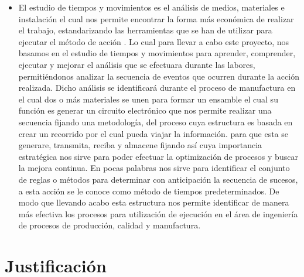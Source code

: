     
\begin{itemize}
    \item El estudio de tiempos y movimientos es el análisis de medios, materiales e instalación el cual nos permite encontrar la forma más económica de realizar el trabajo, estandarizando las herramientas que se han de utilizar para ejecutar el método de acción . Lo cual para llevar a cabo este proyecto, nos basamos en el estudio de tiempos y movimientos para aprender, comprender, ejecutar y  mejorar el análisis que se efectuara durante las labores, permitiéndonos analizar la secuencia de eventos que ocurren durante la acción  realizada. 
Dicho análisis se identificará durante el proceso de manufactura en el cual dos o más materiales se unen para formar un ensamble el cual su función es generar un circuito electrónico que nos permite realizar una secuencia fijando una metodología, del proceso cuya estructura es basada en crear un recorrido por el cual pueda viajar la información. para que esta se generare, transmita, reciba y almacene fijando así cuya importancia estratégica nos sirve para poder efectuar la optimización de procesos y buscar la mejora continua. En pocas palabras nos sirve para identificar el conjunto de reglas o métodos para determinar con anticipación la secuencia de sucesos, a esta acción se le conoce como método de tiempos predeterminados. De modo que  llevando acabo  esta estructura nos permite identificar de manera más efectiva los procesos para utilización de ejecución en el área de ingeniería de procesos de producción, calidad y manufactura.  

        
    
    \end{itemize}
    \section{Justificación}
    
